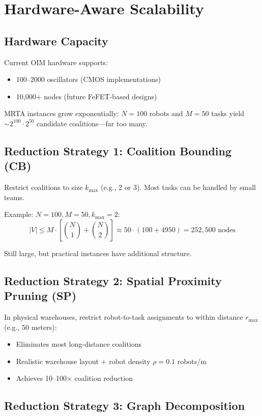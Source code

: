 \section{Hardware-Aware Scalability}
\label{sec:scalability}

\subsection{Hardware Capacity}

Current OIM hardware supports:
\begin{itemize}
\item 100--2000 oscillators (CMOS implementations)
\item 10,000+ nodes (future FeFET-based designs)
\end{itemize}

MRTA instances grow exponentially: $N=100$ robots and $M=50$ tasks yield $\sim 2^{100} \cdot 2^{50}$ candidate coalitions---far too many.

\subsection{Reduction Strategy 1: Coalition Bounding (CB)}

Restrict coalitions to size $k_{\max}$ (e.g., 2 or 3). Most tasks can be handled by small teams.

Example: $N=100, M=50, k_{\max}=2$:
\[
|V| \leq M \cdot \left[\binom{N}{1} + \binom{N}{2}\right] \approx 50 \cdot (100 + 4950) = 252,500 \text{ nodes}
\]

Still large, but practical instances have additional structure.

\subsection{Reduction Strategy 2: Spatial Proximity Pruning (SP)}

In physical warehouses, restrict robot-to-task assignments to within distance $r_{\max}$ (e.g., 50 meters):
\begin{itemize}
\item Eliminates most long-distance coalitions
\item Realistic warehouse layout + robot density $\rho = 0.1$ robots/m
\item Achieves 10--100× coalition reduction
\end{itemize}

\subsection{Reduction Strategy 3: Graph Decomposition}

